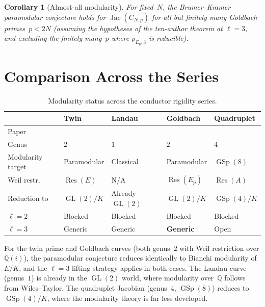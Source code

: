 \documentclass[11pt,a4paper]{article}
\newtheorem{corollary}[theorem]{Corollary}
\theoremstyle{definition}
\DeclareMathOperator{\GL}{GL}
\DeclareMathOperator{\GSp}{GSp}
\DeclareMathOperator{\Jac}{Jac}
\DeclareMathOperator{\Res}{Res}
\begin{document}
\begin{corollary}[Almost-all modularity]\label{cor:almost_all}
For fixed~$N$, the Brumer--Kramer paramodular conjecture holds for $\Jac(C_{N,p})$ for all but finitely many Goldbach primes~$p < 2N$ \textup{(}assuming the hypotheses of the ten-author theorem \cite{TenAuthor} at $\ell = 3$, and excluding the finitely many~$p$ where $\bar{\rho}_{E_p,3}$ is reducible\textup{)}.
\end{corollary}

\section{Comparison Across the Series}\label{sec:comparison}

\begin{table}[ht]
\centering
\renewcommand{\arraystretch}{1.3}
\begin{tabular}{>{\raggedright}p{2.5cm} p{2.5cm} p{2.5cm} p{2.5cm} p{3cm}}
\toprule
& \textbf{Twin} & \textbf{Landau} & \textbf{Goldbach} & \textbf{Quadruplet} \\
\midrule
Paper & \cite{Companion3} & \cite{Companion4} & \cite{Companion7} & \cite{Companion6} \\
Genus & $2$ & $1$ & $2$ & $4$ \\
Modularity target & Paramodular & Classical & Paramodular & $\GSp(8)$ \\
Weil restr.\ & $\Res(E)$ & N/A & $\Res(E_p)$ & $\Res(A)$ \\
Reduction to & $\GL(2)/K$ & Already $\GL(2)$ & $\GL(2)/K$ & $\GSp(4)/K$ \\
$\ell = 2$ & Blocked & Blocked & Blocked & Blocked \\
$\ell = 3$ & Generic & Generic & \textbf{Generic} & Open \\
\bottomrule
\end{tabular}
\caption{Modularity status across the conductor rigidity series.}
\label{tab:series}
\end{table}

For the twin prime and Goldbach curves (both genus~$2$ with Weil restriction over $\mathbb{Q}(i)$), the paramodular conjecture reduces identically to Bianchi modularity of $E/K$, and the $\ell = 3$ lifting strategy applies in both cases. The Landau curve (genus~$1$) is already in the $\GL(2)$ world, where modularity over~$\mathbb{Q}$ follows from Wiles--Taylor. The quadruplet Jacobian (genus~$4$, $\GSp(8)$) reduces to $\GSp(4)/K$, where the modularity theory is far less developed.
\end{document}
